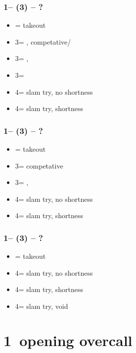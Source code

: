 \documentclass[12pt, a4paper]{report}
\begin{document}
\subsubsection*{1\hearts -- (3\clubs) -- ?}
\begin{itemize}
    \item \dbl = takeout
    \item 3\diams = \hearts, competative/\gf
    \item 3\hearts = \hearts, \inv
    \item 3\spades = \spades\ \gf
    \item 4\clubs = slam try, no \clubs shortness
    \item 4\diams = slam try, \clubs shortness
\end{itemize}

\subsubsection*{1\hearts -- (3\diams) -- ?}
\begin{itemize}
    \item \dbl = takeout
    \item 3\hearts = competative
    \item 3\spades = \spades, \gf
    \item 4\clubs = slam try, no \diams shortness
    \item 4\diams = slam try, \diams shortness
\end{itemize}

\subsubsection*{1\hearts -- (3\spades) -- ?}
\begin{itemize}
    \item \dbl = takeout
    \item 4\clubs = slam try, no \spades shortness
    \item 4\diams = slam try, \spades shortness
    \item 4\spades = slam try, \spades void
\end{itemize}

\section*{\colorbox{blue!30}{1\spades\ opening overcall}}
\end{document}
